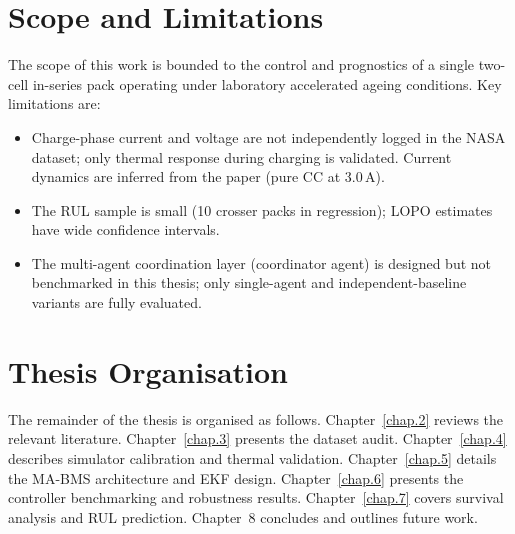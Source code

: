\section{Scope and Limitations}

The scope of this work is bounded to the control and prognostics of a
single two-cell in-series pack operating under laboratory accelerated
ageing conditions.  Key limitations are:

\begin{itemize}
  \item Charge-phase current and voltage are not independently logged
  in the NASA dataset; only thermal response during charging is
  validated.  Current dynamics are inferred from the paper (pure CC
  at 3.0\,A).
  \item The RUL sample is small (10 crosser packs in regression);
  LOPO estimates have wide confidence intervals.
  \item The multi-agent coordination layer (coordinator agent) is
  designed but not benchmarked in this thesis; only single-agent and
  independent-baseline variants are fully evaluated.
\end{itemize}

\section{Thesis Organisation}

The remainder of the thesis is organised as follows.
Chapter~\ref{chap.2} reviews the relevant literature.
Chapter~\ref{chap.3} presents the dataset audit.
Chapter~\ref{chap.4} describes simulator calibration and thermal
validation.  Chapter~\ref{chap.5} details the MA-BMS architecture and
EKF design.  Chapter~\ref{chap.6} presents the controller
benchmarking and robustness results.  Chapter~\ref{chap.7} covers
survival analysis and RUL prediction.  Chapter~8 concludes and
outlines future work.
